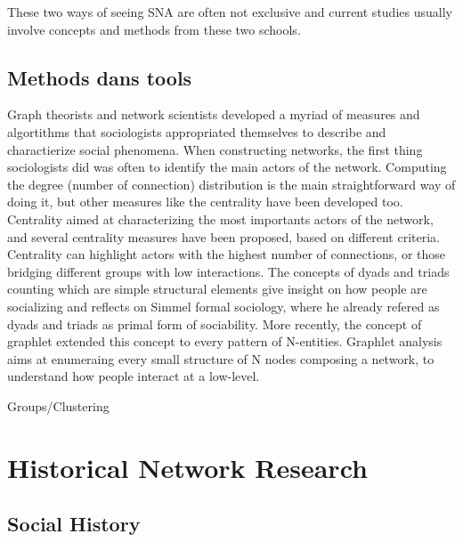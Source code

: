 These two ways of seeing SNA are often not exclusive and current studies usually involve concepts and methods from these two schools.

\subsection{Methods dans tools}

Graph theorists and network scientists developed a myriad of measures and algortithms that sociologists appropriated themselves to describe and charactierize social phenomena.
When constructing networks, the first thing sociologists did was often to identify the main actors of the network. Computing the degree (number of connection) distribution is the main straightforward way of doing it, but other measures like the centrality have been developed too. Centrality aimed at characterizing the most importants actors of the network, and several centrality measures have been proposed, based on different criteria. Centrality can highlight actors with the highest number of connections, or those bridging different groups with low interactions.
The concepts of dyads and triads counting which are simple structural elements give insight on how people are socializing and reflects on Simmel formal sociology, where he already refered as dyads and triads as primal form of sociability. More recently, the concept of graphlet extended this concept to every pattern of N-entities. Graphlet analysis aims at enumeraing every small structure of N nodes composing a network, to understand how people interact at a low-level.


Groups/Clustering







\section{Historical Network Research}

\subsection{Social History}


